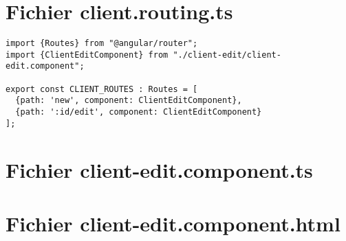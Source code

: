 \appendix
{}

\section{Fichier client.routing.ts}
\label{routing-client}
\begin{lstlisting}[style=htmlcssjs]
import {Routes} from "@angular/router";
import {ClientEditComponent} from "./client-edit/client-edit.component";

export const CLIENT_ROUTES : Routes = [
  {path: 'new', component: ClientEditComponent},
  {path: ':id/edit', component: ClientEditComponent}
];
\end{lstlisting}



\section{Fichier client-edit.component.ts}
\label{client-edit-ts}


\section{Fichier client-edit.component.html}
\label{client-edit-html}

